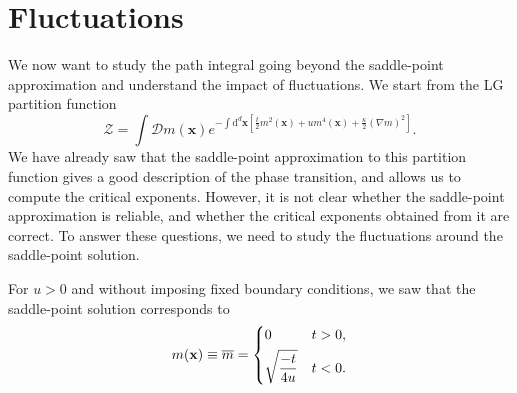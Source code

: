 \section{Fluctuations}

We now want to study the path integral going beyond the saddle-point approximation and understand the impact of fluctuations. We start from the LG partition function
\[
    \mathcal{Z} = \int \mathcal{D}m(\mathbf{x}) e^{-\int \mathrm{d}^d \mathbf{x} \left[ \frac{t}{2}m^2(\mathbf{x}) + u m^4(\mathbf{x}) + \frac{\kappa}{2}(\nabla m)^2 \right]}.
\]
We have already saw that the saddle-point approximation to this partition function gives a good description of the phase transition, and allows us to compute the critical exponents. However, it is not clear whether the saddle-point approximation is reliable, and whether the critical exponents obtained from it are correct. To answer these questions, we need to study the fluctuations around the saddle-point solution.

For \( u > 0 \) and without imposing fixed boundary conditions, we saw that the saddle-point solution corresponds to
\[
    m(\mathbf{x}) \equiv \overline{m} = \begin{dcases}
        0                    & t > 0, \\
        \sqrt{\frac{-t}{4u}} & t < 0.
    \end{dcases}
\]

